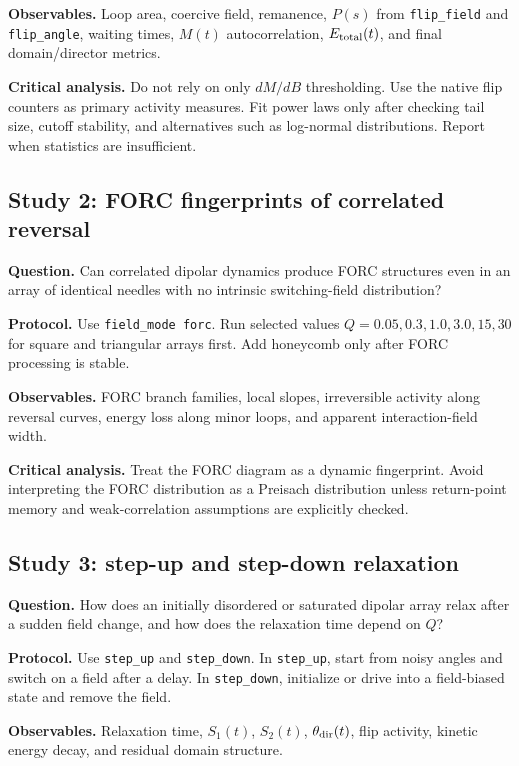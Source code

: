 \documentclass[11pt,a4paper]{article}
\newcommand{\code}[1]{\texttt{#1}}
\begin{document}
\textbf{Observables.} Loop area, coercive field, remanence, $P(s)$ from \code{flip\_field} and \code{flip\_angle}, waiting times, $M(t)$ autocorrelation, $E_{\rm total}(t)$, and final domain/director metrics.

\textbf{Critical analysis.} Do not rely on only $dM/dB$ thresholding. Use the native flip counters as primary activity measures. Fit power laws only after checking tail size, cutoff stability, and alternatives such as log-normal distributions. Report when statistics are insufficient.

\subsection{Study 2: FORC fingerprints of correlated reversal}

\textbf{Question.} Can correlated dipolar dynamics produce FORC structures even in an array of identical needles with no intrinsic switching-field distribution?

\textbf{Protocol.} Use \code{field\_mode forc}. Run selected values $Q=0.05,0.3,1.0,3.0,15,30$ for square and triangular arrays first. Add honeycomb only after FORC processing is stable.

\textbf{Observables.} FORC branch families, local slopes, irreversible activity along reversal curves, energy loss along minor loops, and apparent interaction-field width.

\textbf{Critical analysis.} Treat the FORC diagram as a dynamic fingerprint. Avoid interpreting the FORC distribution as a Preisach distribution unless return-point memory and weak-correlation assumptions are explicitly checked.

\subsection{Study 3: step-up and step-down relaxation}

\textbf{Question.} How does an initially disordered or saturated dipolar array relax after a sudden field change, and how does the relaxation time depend on $Q$?

\textbf{Protocol.} Use \code{step\_up} and \code{step\_down}. In \code{step\_up}, start from noisy angles and switch on a field after a delay. In \code{step\_down}, initialize or drive into a field-biased state and remove the field.

\textbf{Observables.} Relaxation time, $S_1(t)$, $S_2(t)$, $\theta_{\rm dir}(t)$, flip activity, kinetic energy decay, and residual domain structure.
\end{document}
